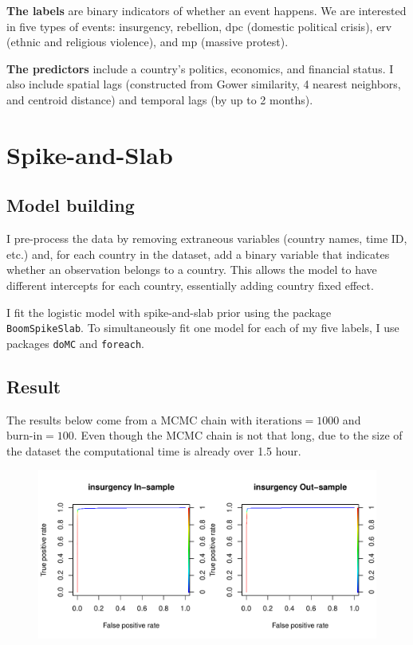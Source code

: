 \documentclass[12pt]{article}
\begin{document}
\textbf{The labels} are binary indicators of whether an event happens. We are interested in five types of events: insurgency, rebellion, dpc (domestic political crisis), erv (ethnic and religious violence), and mp (massive protest).

\textbf{The predictors} include a country's politics, economics, and financial status. I also include spatial lags (constructed from Gower similarity, 4 nearest neighbors, and centroid distance) and temporal lags (by up to 2 months).

\section{Spike-and-Slab}

\subsection{Model building}
I pre-process the data by removing extraneous variables (country names, time ID, etc.) and, for each country in the dataset, add a binary variable that indicates whether an observation belongs to a country. This allows the model to have different intercepts for each country, essentially adding country fixed effect.

I fit the logistic model with spike-and-slab prior using the package \verb|BoomSpikeSlab|. To simultaneously fit one model for each of my five labels, I use packages \verb|doMC| and \verb|foreach|. 

\subsection*{Result}

The results below come from a MCMC chain with $\text{iterations}=1000$ and $\text{burn-in}=100$. Even though the MCMC chain is not that long, due to the size of the dataset the computational time is already over 1.5 hour. 



\begin{figure}
\includegraphics[width=\textwidth]{fig/roc_insurgency}
\end{figure}
\end{document}
